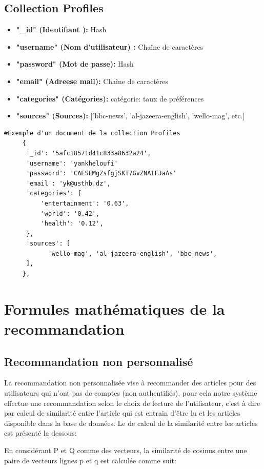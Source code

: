 \subsection{Collection Profiles}
\begin{itemize}
     \item \textbf{"\_id" (Identifiant ): } Hash
     \item \textbf{"username" (Nom d'utilisateur) : } Chaîne de caractères
     \item \textbf{"password" (Mot de passe): } Hash
     \item \textbf{"email" (Adreese mail): } Chaîne de caractères
     \item \textbf{"categories" (Catégories): } {catégorie: taux de préférences }
     \item \textbf{"sources" (Sources): } ['bbc-news', 'al-jazeera-english', 'wello-mag', etc.] 
\end{itemize}
\begin{lstlisting}[style=code]
      #Exemple d'un document de la collection Profiles 
     {
      '_id': '5afc18571d41c833a8632a24', 
      'username': 'yankheloufi'
      'password': 'CAESEMgZsfgjSKT7GvZNAtFJaAs'
      'email': 'yk@usthb.dz',
      'categories': {
          'entertainment': '0.63',
          'world': '0.42',
          'health': '0.12',
      },
      'sources': [
            'wello-mag', 'al-jazeera-english', 'bbc-news', 
      ],
     },
     \end{lstlisting}


\section{Formules mathématiques de la recommandation}

\subsection{Recommandation non personnalisé}
La recommandation non personnalisée vise à recommander des articles pour des utilisateurs qui n'ont pas de comptes (non authentifiés), pour cela notre système effectue une recommandation selon le choix de lecture de l'utilisateur, c'est à dire par calcul de similarité entre l'article qui est entrain d'être lu et les articles disponible dans la base de données. Le de calcul de la similarité entre les articles est présenté la dessous:

En considérant P et Q comme des vecteurs, la similarité de cosinus entre une paire de vecteurs lignes p et q est calculée comme suit:

